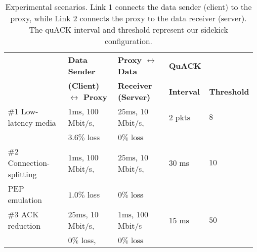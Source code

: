 \begin{table*}[h]
  \centering
  \small
  \begin{tabular}{lllll}
    \toprule
    & \bf Data Sender  & \bf Proxy $\leftrightarrow$ Data & \bf QuACK     & \\
    & \bf (Client) $\leftrightarrow$ Proxy & \bf Receiver (Server) & \bf Interval & \bf Threshold \\
    \midrule
    \#1 Low-latency media & $1$ms, $100$ Mbit/s, & $25$ms, $10$ Mbit/s, & $2$ pkts & $8$ \\
                          & $3.6\%$ loss         & $0\%$ loss           &          &     \\

    \#2 Connection-splitting & $1$ms, $100$ Mbit/s, & $25$ms, $10$ Mbit/s, & $30$ ms & $10$ \\
    PEP emulation            & $1.0\%$ loss         & $0\%$ loss           &         & \\

    \#3 ACK reduction & $25$ms, $10$ Mbit/s, & $1$ms, $100$ Mbit/s & $15$ ms & $50$ \\
                      & $0\%$ loss,          & $0\%$ loss          &         & \\
    \bottomrule
  \end{tabular}
  \caption{Experimental scenarios. Link 1 connects the data sender (client) to
  the proxy, while Link 2 connects the proxy to the data receiver (server).
  The quACK interval and threshold represent our sidekick configuration.
  }
  \label{tab:experimental-scenarios}
\end{table*}
